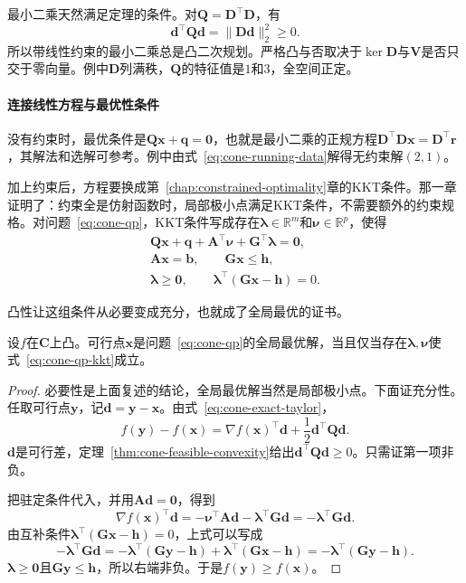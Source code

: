 最小二乘天然满足定理的条件。对$\bm{Q}=\bm{D}^\top\bm{D}$，有
\[
 \bm{d}^\top\bm{Q}\bm{d}=\lVert\bm{D}\bm{d}\rVert_2^2\geq0.
\]
所以带线性约束的最小二乘总是凸二次规划。严格凸与否取决于$\ker\bm{D}$与$\bm{V}$是否只交于零向量。例中$\bm{D}$列满秩，$\bm{Q}$的特征值是$1$和$3$，全空间正定。

\paragraph{连接线性方程与最优性条件}
没有约束时，最优条件是$\bm{Q}\bm{x}+\bm{q}=\bm{0}$，也就是最小二乘的正规方程$\bm{D}^\top\bm{D}\bm{x}=\bm{D}^\top\bm{r}$，其解法和选解可参考。例中由式~\eqref{eq:cone-running-data}解得无约束解$(2,1)$。

加上约束后，方程要换成第~\ref{chap:constrained-optimality}章的KKT条件。那一章证明了：约束全是仿射函数时，局部极小点满足KKT条件，不需要额外的约束规格。对问题~\eqref{eq:cone-qp}，KKT条件写成存在$\bm{\lambda}\in\mathbb{R}^m$和$\bm{\nu}\in\mathbb{R}^p$，使得
\begin{equation}
 \begin{gathered}
 \bm{Q}\bm{x}+\bm{q}+\bm{A}^\top\bm{\nu}+\bm{G}^\top\bm{\lambda}=\bm{0},\\
 \bm{A}\bm{x}=\bm{b},\qquad\bm{G}\bm{x}\leq\bm{h},\\
 \bm{\lambda}\geq\bm{0},\qquad\bm{\lambda}^\top(\bm{G}\bm{x}-\bm{h})=0.
 \end{gathered}
 \label{eq:cone-qp-kkt}
\end{equation}

凸性让这组条件从必要变成充分，也就成了全局最优的证书。

\begin{theorem}[凸二次规划的KKT证书]
\label{thm:cone-qp-kkt}
设$f$在$\bm{C}$上凸。可行点$\bm{x}$是问题~\eqref{eq:cone-qp}的全局最优解，当且仅当存在$\bm{\lambda},\bm{\nu}$使式~\eqref{eq:cone-qp-kkt}成立。
\end{theorem}

\begin{proof}
必要性是上面复述的结论，全局最优解当然是局部极小点。下面证充分性。任取可行点$\bm{y}$，记$\bm{d}=\bm{y}-\bm{x}$。由式~\eqref{eq:cone-exact-taylor}，
\[
 f(\bm{y})-f(\bm{x})=\nabla f(\bm{x})^\top\bm{d}+\frac12\bm{d}^\top\bm{Q}\bm{d}.
\]
$\bm{d}$是可行差，定理~\ref{thm:cone-feasible-convexity}给出$\bm{d}^\top\bm{Q}\bm{d}\geq0$。只需证第一项非负。

把驻定条件代入，并用$\bm{A}\bm{d}=\bm{0}$，得到
\[
 \nabla f(\bm{x})^\top\bm{d}=-\bm{\nu}^\top\bm{A}\bm{d}-\bm{\lambda}^\top\bm{G}\bm{d}=-\bm{\lambda}^\top\bm{G}\bm{d}.
\]
由互补条件$\bm{\lambda}^\top(\bm{G}\bm{x}-\bm{h})=0$，上式可以写成
\[
 -\bm{\lambda}^\top\bm{G}\bm{d}=-\bm{\lambda}^\top(\bm{G}\bm{y}-\bm{h})+\bm{\lambda}^\top(\bm{G}\bm{x}-\bm{h})=-\bm{\lambda}^\top(\bm{G}\bm{y}-\bm{h}).
\]
$\bm{\lambda}\geq\bm{0}$且$\bm{G}\bm{y}\leq\bm{h}$，所以右端非负。于是$f(\bm{y})\geq f(\bm{x})$。
\end{proof}

